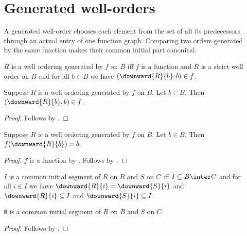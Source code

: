 \section{Generated well-orders}





A generated well-order chooses each element from the set of all its
predecessors through an actual entry of one function graph.  Comparing two
orders generated by the same function makes their common initial part
canonical.

\begin{definition}\label{generated_well_ordering}
    $R$ is a well ordering generated by $f$ on $B$ iff
        $f$ is a function and
        $R$ is a strict well order on $B$ and
        for all $b\in B$ we have $(\downward{R}{b},b)\in f$.
\end{definition}

\begin{proposition}\label{generated_well_ordering_entry}
    Suppose $R$ is a well ordering generated by $f$ on $B$.
    Let $b\in B$.
    Then $(\downward{R}{b},b)\in f$.
\end{proposition}
\begin{proof}
    Follows by .
\end{proof}

\begin{proposition}\label{generated_well_ordering_apply}
    Suppose $R$ is a well ordering generated by $f$ on $B$.
    Let $b\in B$.
    Then $f(\downward{R}{b})=b$.
\end{proposition}
\begin{proof}
    $f$ is a function by .
    Follows by
        .
\end{proof}

\begin{definition}\label{common_initial_segment}
    $I$ is a common initial segment of $R$ on $B$ and $S$ on $C$ iff
        $I\subseteq B\inter C$ and
        for all $i\in I$ we have
            $\downward{R}{i} = \downward{S}{i}$ and
            $\downward{R}{i}\subseteq I$ and
            $\downward{S}{i}\subseteq I$.
\end{definition}

\begin{lemma}\label{empty_common_initial_segment}
    $\emptyset$ is a common initial segment of $R$ on $B$ and $S$ on $C$.
\end{lemma}
\begin{proof}
    Follows by .
\end{proof}

